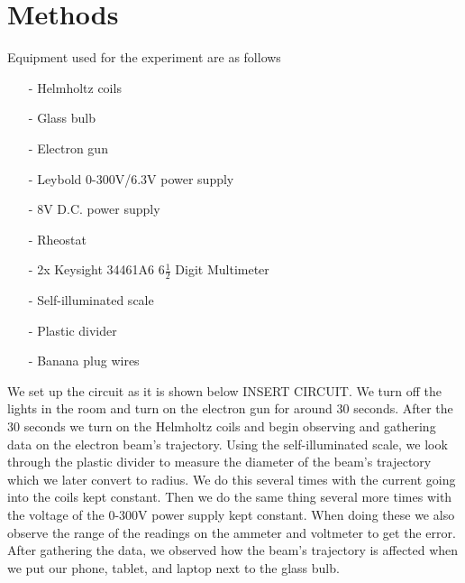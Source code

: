 \documentclass{article}
\begin{document}
\section{Methods}
Equipment used for the experiment are as follows
\begin{itemize}
    \item[-] Helmholtz coils
    \item[-] Glass bulb
    \item[-] Electron gun
    \item[-] Leybold 0-300V/6.3V power supply
    \item[-] 8V D.C. power supply
    \item[-] Rheostat
    \item[-] 2x Keysight 34461A6 6$\frac{1}{2}$ Digit Multimeter
    \item[-] Self-illuminated scale
    \item[-] Plastic divider
    \item[-] Banana plug wires
\end{itemize}
We set up the circuit as it is shown below INSERT CIRCUIT.  We turn off the lights
in the room and turn on the electron gun for around 30 seconds.  After the 30
seconds we turn on the Helmholtz coils and begin observing and gathering data on the
electron beam's trajectory.  Using the self-illuminated scale, we look through the 
plastic divider to measure the diameter of the beam's trajectory which we later 
convert to radius.  We do this several times with the current going into the coils 
kept constant.  Then we do the same thing several more times with the voltage of 
the 0-300V power supply kept constant.  When doing these we also observe the range 
of the readings on the ammeter and voltmeter to get the error.  After gathering the 
data, we observed how the beam's trajectory is affected when we put our phone, tablet, 
and laptop next to the glass bulb.
\end{document}
